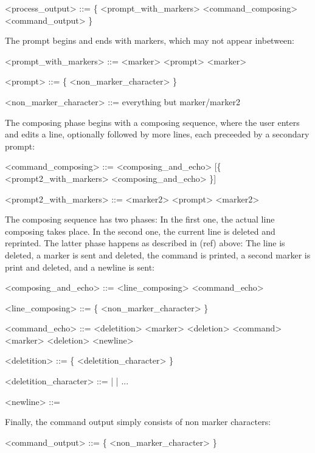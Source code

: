 \documentclass[a4paper,twoside,abstract=on,cleardoublepage=empty,numbers=noenddot,toc=bib]{scrreprt}
\begin{document}
\begin{grammar}
<process_output> ::= \{ <prompt_with_markers> <command_composing> <command_output> \}
\end{grammar}

The prompt begins and ends with markers, which may not appear inbetween:

\begin{grammar}
<prompt_with_markers> ::= <marker> <prompt> <marker>

<prompt> ::= \{ <non_marker_character> \}

<non_marker_character> ::= everything but marker/marker2
\end{grammar}

The composing phase begins with a composing sequence, where the user enters and edits a line, optionally followed by more lines, each preceeded by a secondary prompt:

\begin{grammar}
<command_composing> ::= <composing_and_echo> [\{ <prompt2_with_markers> <composing_and_echo> \}]

<prompt2_with_markers> ::= <marker2> <prompt> <marker2>
\end{grammar}

The composing sequence has two phases: In the first one, the actual line composing takes place. In the second one, the current line is deleted and reprinted. The latter phase happens as described in (ref) above: The line is deleted, a marker is sent and deleted, the command is printed, a second marker is print and deleted, and a newline is sent:

\begin{grammar}
<composing_and_echo> ::= <line_composing> <command_echo>

<line_composing> ::= \{ <non_marker_character> \}

<command_echo> ::= <deletition> <marker> <deletion> <command> <marker> <deletion> <newline>

<deletition> ::= \{ <deletition_character> \}

<deletition_character> ::=  |  | ...

<newline> ::= 
\end{grammar}

Finally, the command output simply consists of non marker characters:

\begin{grammar}
<command_output> ::= \{ <non_marker_character> \}
\end{grammar}
\end{document}
